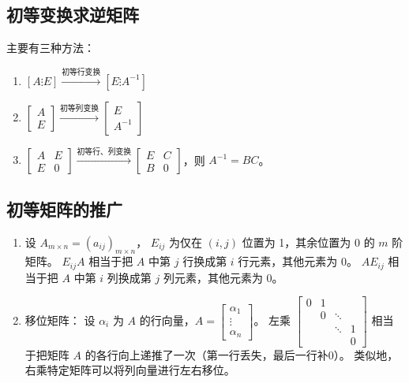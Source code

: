 \documentclass[UTF8]{ctexart}
\theoremstyle{mydef}
\begin{document}
\subsection{初等变换求逆矩阵}
主要有三种方法：
\begin{enumerate}
    \item $[A \vdots E] \xrightarrow{\text{初等行变换}} [E \vdots A^{-1}]$
    \item $\begin{bmatrix} A \\ E \end{bmatrix} \xrightarrow{\text{初等列变换}} \begin{bmatrix} E \\ A^{-1} \end{bmatrix}$
    \item $\begin{bmatrix} A & E \\ E & 0 \end{bmatrix} \xrightarrow{\text{初等行、列变换}} \begin{bmatrix} E & C \\ B & 0 \end{bmatrix}$，则 $A^{-1} = BC$。
\end{enumerate}

\subsection{初等矩阵的推广}
\begin{enumerate}
    \item 设 $A_{m \times n} = (a_{ij})_{m \times n}$， $E_{ij}$ 为仅在 $(i,j)$ 位置为 1，其余位置为 0 的 $m$ 阶矩阵。
    $E_{ij}A$ 相当于把 $A$ 中第 $j$ 行换成第 $i$ 行元素，其他元素为 0。
    $AE_{ij}$ 相当于把 $A$ 中第 $i$ 列换成第 $j$ 列元素，其他元素为 0。
    \item 移位矩阵：
    设 $\alpha_i$ 为 $A$ 的行向量，$A = \begin{bmatrix} \alpha_1 \\ \vdots \\ \alpha_n \end{bmatrix}$。
    左乘 $\begin{bmatrix} 0 & 1 & & \\ & 0 & \ddots & \\ & & \ddots & 1 \\ & & & 0 \end{bmatrix}$ 相当于把矩阵 $A$ 的各行向上递推了一次（第一行丢失，最后一行补0）。
    类似地，右乘特定矩阵可以将列向量进行左右移位。
\end{enumerate}
\end{document}
